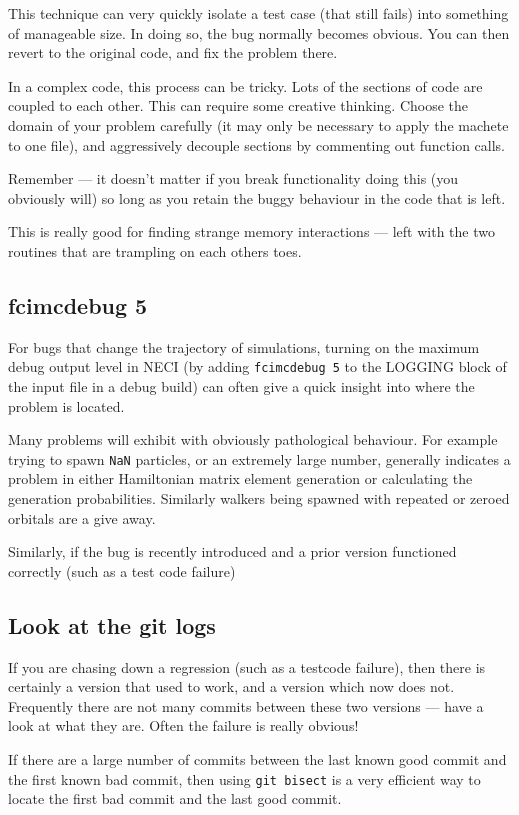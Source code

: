 \documentclass[a4paper,notitlepage]{scrreprt}
\let\code\lstinline
\begin{document}
{{{	This technique can very quickly isolate a test case (that still fails) into
	something of manageable size. In doing so, the bug normally becomes
	obvious. You can then revert to the original code, and fix the problem
	there.

	In a complex code, this process can be tricky. Lots of the sections of code
	are coupled to each other. This can require some creative thinking. Choose
	the domain of your problem carefully (it may only be necessary to apply the
	machete to one file), and aggressively decouple sections by commenting out
	function calls.

	Remember --- it doesn't matter if you break functionality doing this (you
	obviously will) so long as you retain the buggy behaviour in the code that
	is left.

	This is really good for finding strange memory interactions --- left with
	the two routines that are trampling on each others toes.

\subsection{{\ttfamily fcimcdebug 5}}
	For bugs that change the trajectory of simulations, turning on the maximum
	debug output level in NECI (by adding \code{fcimcdebug 5} to the
	LOGGING block of the input file in a debug build) can often give a quick
	insight into where the problem is located.

	Many problems will exhibit with obviously pathological behaviour. For
	example trying to spawn \code{NaN} particles, or an extremely large
	number, generally indicates a problem in either Hamiltonian matrix element
	generation or calculating the generation probabilities. Similarly walkers
	being spawned with repeated or zeroed orbitals are a give away.

	Similarly, if the bug is recently introduced and a prior version functioned
	correctly (such as a test code failure)

\subsection{Look at the git logs}
	If you are chasing down a regression (such as a testcode failure), then
	there is certainly a version that used to work, and a version which now
	does not. Frequently there are not many commits between these two versions
	--- have a look at what they are. Often the failure is really obvious!

	If there are a large number of commits between the last known good commit
	and the first known bad commit, then using \code{git bisect} is a very
	efficient way to locate the first bad commit and the last good commit.


}}}
\end{document}
